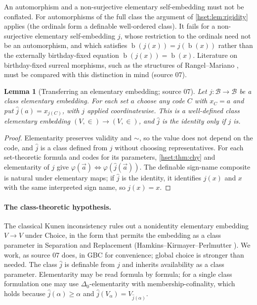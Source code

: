 \documentclass[11pt,letterpaper]{article}
\newtheorem{lemma}[lemma]{Lemma}\aliascntresetthe{lemma}
\theoremstyle{definition}
\theoremstyle{remark}
\newcommand{\bd}{\operatorname{b}}
\newcommand{\B}{\mathcal B}
\begin{document}
An automorphism and a non-surjective elementary self-embedding must not be
conflated. For automorphisms of the full class the argument of
\cref{hset:lem:rigidity} applies (the ordinals form a definable well-ordered
class). It fails for a non-surjective elementary self-embedding $j$, whose
restriction to the ordinals need not be an automorphism, and which satisfies
$\bd(j(x))=j(\bd(x))$ rather than the externally birthday-fixed equation
$\bd(j(x))=\bd(x)$. Literature on birthday-fixed surreal morphisms, such as the
structures of Rangel--Mariano \cite{RM}, must be compared with this distinction
in mind (source 07).

\begin{lemma}[Transferring an elementary embedding; source 07]
\label{hset:lem:embedding-transfer}
Let $j:\B\to\B$ be a class elementary embedding. For each set $a$ choose any
code $C$ with $x_C=a$ and put $\widehat j(a)=x_{j(C)}$, with $j$ applied
coordinatewise. This is a well-defined class elementary embedding
$(V,\in)\to(V,\in)$, and $\widehat j$ is the identity only if $j$ is.
\end{lemma}
\begin{proof}
Elementarity preserves validity and $\sim$, so the value does not depend on the
code, and $\widehat j$ is a class defined from $j$ without choosing
representatives. For each set-theoretic formula and codes for its parameters,
\cref{hset:thm:chy} and elementarity of $j$ give
$\varphi(\vec a)\iff\varphi(\widehat j(\vec a))$. The definable sign-name
composite is natural under elementary maps; if $\widehat j$ is the identity, it
identifies $j(x)$ and $x$ with the same interpreted sign name, so $j(x)=x$.
\end{proof}

\paragraph{The class-theoretic hypothesis.} The classical Kunen inconsistency
rules out a nonidentity elementary embedding $V\to V$ under Choice, in the form
that permits the embedding as a class parameter in Separation and Replacement
(Hamkins--Kirmayer--Perlmutter \cite{HKP}). We work, as source 07 does, in GBC
for convenience; global choice is stronger than needed. The class $\widehat j$
is definable from $j$ and inherits availability as a class parameter.
Elementarity may be read formula by formula; for a single class formulation one
may use $\Delta_0$-elementarity with membership-cofinality, which holds because
$\widehat j(\alpha)\ge\alpha$ and $\widehat j(V_\alpha)=V_{\widehat j(\alpha)}$.
\end{document}
